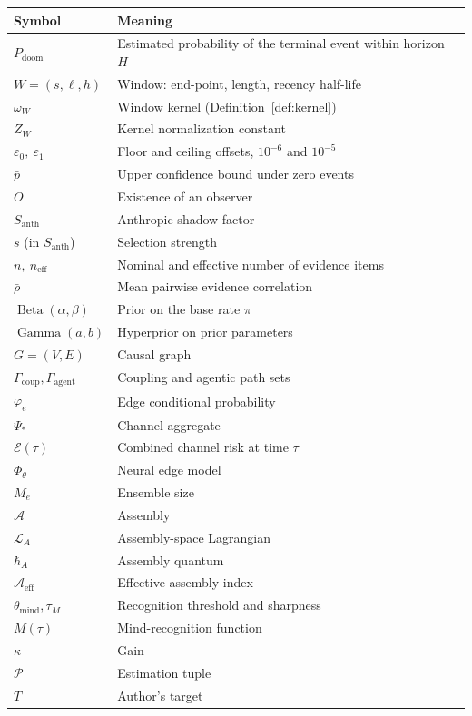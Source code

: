 \documentclass[11pt]{article}
\theoremstyle{remark}
\DeclareMathOperator{\Beta}{Beta}
\DeclareMathOperator{\Gam}{Gamma}
\newcommand{\PD}{P_{\mathrm{doom}}}
\newcommand{\Aeff}{\mathcal{A}_{\mathrm{eff}}}
\newcommand{\Santh}{S_{\mathrm{anth}}}
\newcommand{\rhobar}{\bar{\rho}}
\newcommand{\eone}{\varepsilon_1}
\newcommand{\ezero}{\varepsilon_0}
\begin{document}
\begin{center}
\small
\begin{tabular}{@{}p{2.2cm}p{10.5cm}@{}}
\toprule
Symbol & Meaning \\
\midrule
$\PD$ & Estimated probability of the terminal event within horizon $H$ \\
$W=(s,\ell,h)$ & Window: end-point, length, recency half-life \\
$\omega_W$ & Window kernel (Definition~\ref{def:kernel}) \\
$Z_W$ & Kernel normalization constant \\
$\ezero,\ \eone$ & Floor and ceiling offsets, $10^{-6}$ and $10^{-5}$ \\
$\bar{p}$ & Upper confidence bound under zero events \\
$O$ & Existence of an observer \\
$\Santh$ & Anthropic shadow factor \\
$s$ (in $\Santh$) & Selection strength \\
$n,\ n_{\mathrm{eff}}$ & Nominal and effective number of evidence items \\
$\rhobar$ & Mean pairwise evidence correlation \\
$\Beta(\alpha,\beta)$ & Prior on the base rate $\pi$ \\
$\Gam(a,b)$ & Hyperprior on prior parameters \\
$G=(V,E)$ & Causal graph \\
$\Gamma_{\mathrm{coup}},\Gamma_{\mathrm{agent}}$ & Coupling and agentic path sets \\
$\varphi_e$ & Edge conditional probability \\
$\Psi_\ast$ & Channel aggregate \\
$\mathcal{E}(\tau)$ & Combined channel risk at time $\tau$ \\
$\Phi_\theta$ & Neural edge model \\
$M_e$ & Ensemble size \\
$\mathcal{A}$ & Assembly \\
$\mathcal{L}_A$ & Assembly-space Lagrangian \\
$\hbar_A$ & Assembly quantum \\
$\Aeff$ & Effective assembly index \\
$\theta_{\mathrm{mind}},\tau_M$ & Recognition threshold and sharpness \\
$M(\tau)$ & Mind-recognition function \\
$\kappa$ & Gain \\
$\mathcal{P}$ & Estimation tuple \\
$T$ & Author's target \\
\bottomrule
\end{tabular}
\end{center}
\end{document}
